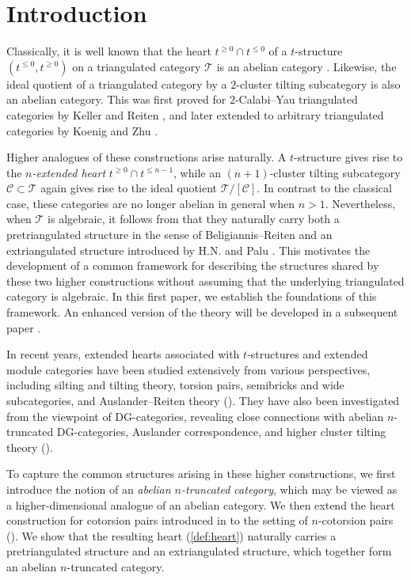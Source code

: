 \documentclass[a4paper,reqno,10pt]{amsart}
\theoremstyle{definition}
\theoremstyle{definition}
\theoremstyle{definition}
\theoremstyle{definition}
\theoremstyle{plain}
\newcommand{\CC}{\mathcal{C}}
\newcommand{\CT}{\mathcal{T}}
\begin{document}
\section*{Introduction}\label{sec:intro}

\color{blue}
Classically, it is well known that the heart $t^{\ge0}\cap t^{\le0}$ of a $t$-structure $(t^{\le0},t^{\ge0})$ on a triangulated category $\CT$ is an abelian category \cite{BBD82}.
Likewise, the ideal quotient of a triangulated category by a $2$-cluster tilting subcategory is also an abelian category. 
This was first proved for $2$-Calabi--Yau triangulated categories by Keller and Reiten \cite{KR07}, and later extended to arbitrary triangulated categories by Koenig and Zhu \cite{KZ08}.

Higher analogues of these constructions arise naturally.
A $t$-structure gives rise to the \emph{$n$-extended heart} $t^{\ge0}\cap t^{\le n-1}$, while an $(n+1)$-cluster tilting subcategory $\CC\subset\CT$ again gives rise to the ideal quotient $\CT/[\CC]$.
In contrast to the classical case, these categories are no longer abelian in general when $n>1$.
Nevertheless, when $\CT$ is algebraic, it follows from \cite{Moc25,Moc26} that they naturally carry both a pretriangulated structure in the sense of Beligiannis--Reiten and an extriangulated structure introduced by H.N. and Palu \cite{NP19}.
This motivates the development of a common framework for describing the structures shared by these two higher constructions without assuming that the underlying triangulated category is algebraic.
In this first paper, we establish the foundations of this framework. An enhanced version of the theory will be developed in a subsequent paper \cite{MNO}.

In recent years, extended hearts associated with $t$-structures and extended module categories have been studied extensively from various perspectives, including silting and tilting theory, torsion pairs, semibricks and wide subcategories, and Auslander--Reiten theory (\cite{Gup24,Zho24,AMP25,GZ25,WZ25,MP26,Run26,HZ26}).
They have also been investigated from the viewpoint of DG-categories, revealing close connections with abelian $n$-truncated DG-categories, Auslander correspondence, and higher cluster tilting theory (\cite{Moc25,Moc26b,Plo26,Moc26}).

To capture the common structures arising in these higher constructions, we first introduce the notion of an \emph{abelian $n$-truncated category}, which may be viewed as a higher-dimensional analogue of an abelian category.
We then extend the heart construction for cotorsion pairs introduced in \cite{Nak11} to the setting of $n$-cotorsion pairs (\cite[Definition~3.1]{HZ22}).
We show that the resulting heart (\cref{def:heart}) naturally carries a pretriangulated structure and an extriangulated structure, which together form an abelian $n$-truncated category.
\end{document}

